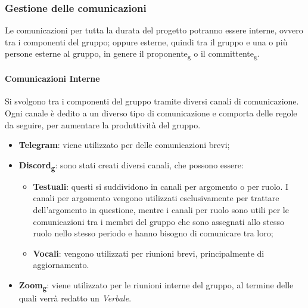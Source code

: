 \subsubsection{Gestione delle comunicazioni}
Le comunicazioni per tutta la durata del progetto potranno essere interne, ovvero tra i componenti del gruppo;
oppure esterne, quindi tra il gruppo e una o più persone esterne al gruppo, in genere il proponente\textsubscript{g} o il committente\textsubscript{g}.

\paragraph{Comunicazioni Interne}
Si svolgono tra i componenti del gruppo tramite diversi canali di comunicazione. 
Ogni canale è dedito a un diverso tipo di comunicazione e comporta delle regole da seguire, per aumentare la 
produttività del gruppo.

\begin{itemize}
    \item \textbf{Telegram}: viene utilizzato per delle comunicazioni brevi;
    \item \textbf{Discord\textsubscript{g}}: sono stati creati diversi canali, che possono essere:
    \begin{itemize}
        \item \textbf{Testuali}: questi si suddividono in canali per argomento o per ruolo. I canali per argomento vengono utilizzati 
        esclusivamente per trattare dell'argomento in questione, mentre i canali per ruolo sono utili per le comunicazioni tra i membri del gruppo che
        sono assegnati allo stesso ruolo nello stesso periodo e hanno bisogno di comunicare tra loro;
        \item \textbf{Vocali}: vengono utilizzati per riunioni brevi, principalmente di aggiornamento.
    \end{itemize}
    \item \textbf{Zoom\textsubscript{g}}: viene utilizzato per le riunioni interne del gruppo, al termine delle quali verrà redatto un \textit{Verbale}.
\end{itemize}


